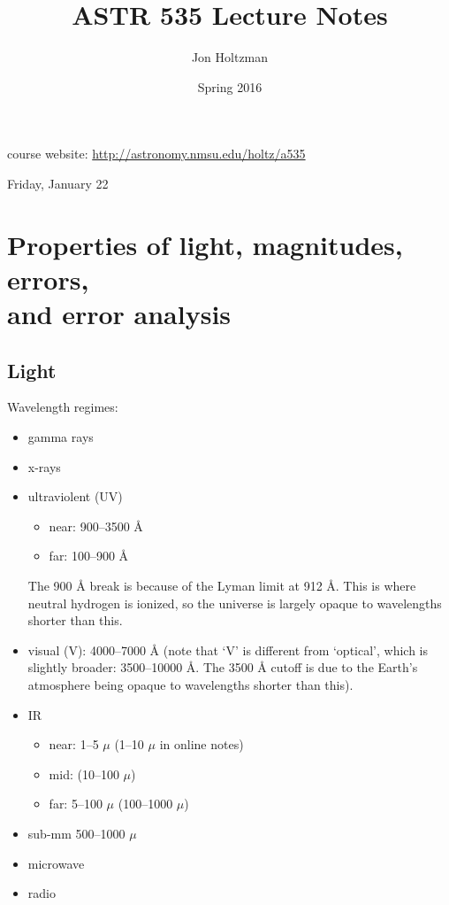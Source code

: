 \documentclass[12pt]{article}
\title{\vspace{-0.75in}ASTR 535 Lecture Notes}
\author{Jon Holtzman}
\date{Spring 2016}
\begin{document}
\maketitle

course website: \textcolor{blue}
{\url{http://astronomy.nmsu.edu/holtz/a535}}


\textcolor{date}{Friday, January 22}
\section{Properties of light, magnitudes, errors,\\
and error analysis}

\subsection{Light}
Wavelength regimes:
\begin{itemize}
    \item gamma rays
    \item x-rays
    \item ultraviolent (UV)
        \begin{itemize}
            \item near: 900--3500 \AA{}
            \item far: 100--900 \AA{}
        \end{itemize}
        The 900 \AA{} break is because of the Lyman limit at 912 \AA{}.
        This is where neutral hydrogen is ionized, so the universe is largely
        opaque to wavelengths shorter than this.
    \item visual (V): 4000--7000 \AA{}
    (note that `V' is different from `optical',
        which is slightly broader: 3500--10000 \AA{}. The 3500 \AA{} cutoff
        is due to the Earth's atmosphere being opaque to wavelengths shorter
        than this).
    \item IR
        \begin{itemize}
            \item near: 1--5 $\mu$ (1--10 $\mu$ in online notes)
            \item mid: (10--100 $\mu$)
            \item far: 5--100 $\mu$ (100--1000 $\mu$)
        \end{itemize}
    \item sub-mm 500--1000 $\mu$
    \item microwave
    \item radio
\end{itemize}
\end{document}
